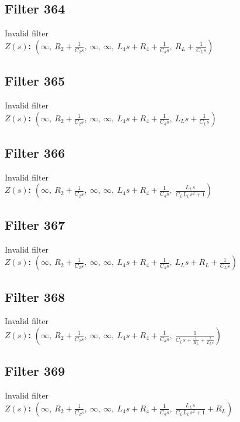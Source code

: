 \documentclass{article}
\begin{document}
\subsection*{Filter 364}
Invalid filter \\ 
\textbf{$Z(s)$:} $\left( \infty, \  R_{2} + \frac{1}{C_{2} s}, \  \infty, \  \infty, \  L_{4} s + R_{4} + \frac{1}{C_{4} s}, \  R_{L} + \frac{1}{C_{L} s}\right)$ \\ 
\subsection*{Filter 365}
Invalid filter \\ 
\textbf{$Z(s)$:} $\left( \infty, \  R_{2} + \frac{1}{C_{2} s}, \  \infty, \  \infty, \  L_{4} s + R_{4} + \frac{1}{C_{4} s}, \  L_{L} s + \frac{1}{C_{L} s}\right)$ \\ 
\subsection*{Filter 366}
Invalid filter \\ 
\textbf{$Z(s)$:} $\left( \infty, \  R_{2} + \frac{1}{C_{2} s}, \  \infty, \  \infty, \  L_{4} s + R_{4} + \frac{1}{C_{4} s}, \  \frac{L_{L} s}{C_{L} L_{L} s^{2} + 1}\right)$ \\ 
\subsection*{Filter 367}
Invalid filter \\ 
\textbf{$Z(s)$:} $\left( \infty, \  R_{2} + \frac{1}{C_{2} s}, \  \infty, \  \infty, \  L_{4} s + R_{4} + \frac{1}{C_{4} s}, \  L_{L} s + R_{L} + \frac{1}{C_{L} s}\right)$ \\ 
\subsection*{Filter 368}
Invalid filter \\ 
\textbf{$Z(s)$:} $\left( \infty, \  R_{2} + \frac{1}{C_{2} s}, \  \infty, \  \infty, \  L_{4} s + R_{4} + \frac{1}{C_{4} s}, \  \frac{1}{C_{L} s + \frac{1}{R_{L}} + \frac{1}{L_{L} s}}\right)$ \\ 
\subsection*{Filter 369}
Invalid filter \\ 
\textbf{$Z(s)$:} $\left( \infty, \  R_{2} + \frac{1}{C_{2} s}, \  \infty, \  \infty, \  L_{4} s + R_{4} + \frac{1}{C_{4} s}, \  \frac{L_{L} s}{C_{L} L_{L} s^{2} + 1} + R_{L}\right)$ \\ 
\end{document}
